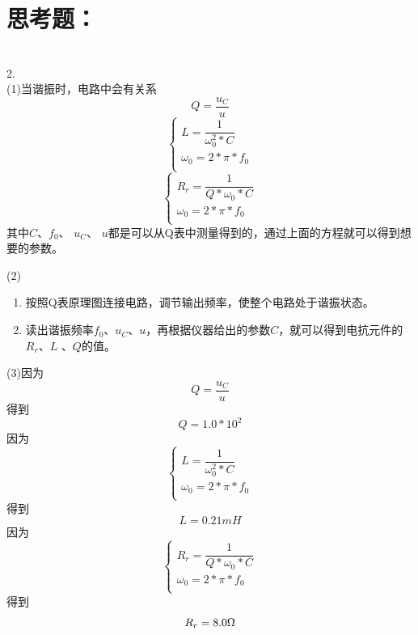 \documentclass[a4paper,11pt]{article}
\begin{document}
\section{思考题：}
\ \\
2.\\

(1)当谐振时，电路中会有关系
\begin{equation}
	 Q = \dfrac{u_{C}}{u} 
\end{equation}
\begin{equation}
	\left\{
	\begin{array}{c}
		L = \dfrac{1}{\omega_{0}^{2} * C} \\
		\omega_{0} = 2 * \pi * f_{0} \\
	\end{array}
	\right.
\end{equation}
\begin{equation}
	\left\{
	\begin{array}{c}
		R_{r} = \dfrac{1}{Q * \omega_{0} * C} \\
		\omega_{0} = 2 * \pi * f_{0} \\
	\end{array}
	\right.
\end{equation}
其中$ C $、$ f_{0} $、 $ u_{C} $、 $ u $都是可以从Q表中测量得到的，通过上面的方程就可以得到想要的参数。

(2)\begin{enumerate}
	\item 按照Q表原理图连接电路，调节输出频率，使整个电路处于谐振状态。
	\item 读出谐振频率$f_{0}$、$u_{C}$、$u$，再根据仪器给出的参数$C$，就可以得到电抗元件的$R_{r}$、$L$ 、$Q$的值。 
	
\end{enumerate}

(3)因为
$$
	Q = \dfrac{u_{C}}{u} 
$$
得到
$$ Q = 1.0 * 10^{2}$$
因为
$$
	\left\{
	\begin{array}{c}
		L = \dfrac{1}{\omega_{0}^{2} * C} \\
		\omega_{0} = 2 * \pi * f_{0} \\
	\end{array}
	\right.
$$
得到
$$ L = 0.21 mH$$
因为
$$
	\left\{
	\begin{array}{c}
		R_{r} = \dfrac{1}{Q * \omega_{0} * C} \\
		\omega_{0} = 2 * \pi * f_{0} \\
	\end{array}
	\right.
$$
得到
$$ R_{r} = 8.0 \ohm $$
\end{document}

